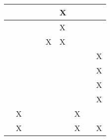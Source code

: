 \begin{longtable}{|l|llllllll|}
    \cite[]{Silano.2020}          & \multicolumn{1}{l|}{}   & \multicolumn{1}{l|}{}    & \multicolumn{1}{l|}{}   & \multicolumn{1}{l|}{}   & \multicolumn{1}{l|}{X}   & \multicolumn{1}{l|}{}   & \multicolumn{1}{l|}{}   & \multicolumn{1}{l|}{}      \\ \hline
    \cite[]{Shah.2017}            & \multicolumn{1}{l|}{}   & \multicolumn{1}{l|}{}    & \multicolumn{1}{l|}{}   & \multicolumn{1}{l|}{}   & \multicolumn{1}{l|}{X}   & \multicolumn{1}{l|}{}   & \multicolumn{1}{l|}{}   & \multicolumn{1}{l|}{}      \\ \hline
    \cite[]{Panerati.332021}      & \multicolumn{1}{l|}{}   & \multicolumn{1}{l|}{}    & \multicolumn{1}{l|}{}  & \multicolumn{1}{l|}{X}   & \multicolumn{1}{l|}{X}   & \multicolumn{1}{l|}{}   & \multicolumn{1}{l|}{}   & \multicolumn{1}{l|}{}      \\ \hline
    \cite[]{Moos.2022}            & \multicolumn{1}{l|}{}   & \multicolumn{1}{l|}{}    & \multicolumn{1}{l|}{}   & \multicolumn{1}{l|}{}   & \multicolumn{1}{l|}{}   & \multicolumn{1}{l|}{}   & \multicolumn{1}{l|}{}   & \multicolumn{1}{l|}{X}      \\ \hline
    \cite[]{Pullum.2022}          & \multicolumn{1}{l|}{}   & \multicolumn{1}{l|}{}    & \multicolumn{1}{l|}{}   & \multicolumn{1}{l|}{}   & \multicolumn{1}{l|}{}   & \multicolumn{1}{l|}{}   & \multicolumn{1}{l|}{}   & \multicolumn{1}{l|}{X}      \\ \hline
    \cite[]{Liu.2023}             & \multicolumn{1}{l|}{}   & \multicolumn{1}{l|}{}    & \multicolumn{1}{l|}{}   & \multicolumn{1}{l|}{}   & \multicolumn{1}{l|}{}   & \multicolumn{1}{l|}{}   & \multicolumn{1}{l|}{}   & \multicolumn{1}{l|}{X}      \\ \hline
    \cite[]{YanDuan.2016}         & \multicolumn{1}{l|}{}   & \multicolumn{1}{l|}{}    & \multicolumn{1}{l|}{}   & \multicolumn{1}{l|}{}   & \multicolumn{1}{l|}{}   & \multicolumn{1}{l|}{}   & \multicolumn{1}{l|}{}   & \multicolumn{1}{l|}{X}      \\ \hline
    \cite[]{Schott.2022}          & \multicolumn{1}{l|}{X}   & \multicolumn{1}{l|}{}    & \multicolumn{1}{l|}{}   & \multicolumn{1}{l|}{}   & \multicolumn{1}{l|}{}   & \multicolumn{1}{l|}{X}   & \multicolumn{1}{l|}{}   & \multicolumn{1}{l|}{}      \\ \hline
    \cite[]{Pinto.2017}           & \multicolumn{1}{l|}{X}   & \multicolumn{1}{l|}{}    & \multicolumn{1}{l|}{}   & \multicolumn{1}{l|}{}   & \multicolumn{1}{l|}{}   & \multicolumn{1}{l|}{X}   & \multicolumn{1}{l|}{}   & \multicolumn{1}{l|}{X}      \\ \hline

\end{longtable}
